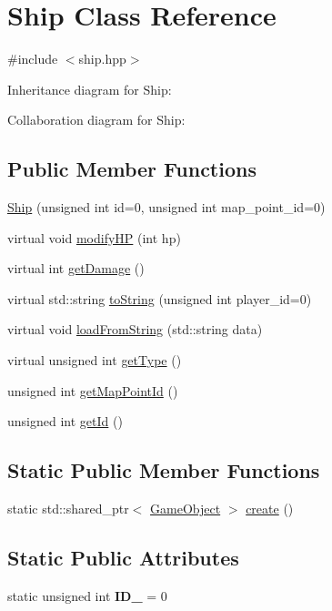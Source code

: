 \hypertarget{classShip}{}\section{Ship Class Reference}
\label{classShip}


{\ttfamily \#include $<$ship.\+hpp$>$}



Inheritance diagram for Ship\+:


Collaboration diagram for Ship\+:
\subsection*{Public Member Functions}
\begin{DoxyCompactItemize}
\item 
\hyperlink{classShip_a53a29a2b25670010054f1213418fa0c3}{Ship} (unsigned int id=0, unsigned int map\+\_\+point\+\_\+id=0)
\item 
virtual void \hyperlink{classShip_af692fb5ca42305b33e0610b9ddfa86ae}{modify\+HP} (int hp)
\item 
virtual int \hyperlink{classShip_a3dc79be9726b79f233dd39e12e42cd9c}{get\+Damage} ()
\item 
virtual std\+::string \hyperlink{classShip_ad743a4cd0710f1cae47440d8c5ef1df2}{to\+String} (unsigned int player\+\_\+id=0)
\item 
virtual void \hyperlink{classShip_a5bc993a110736454a5da0afbce0adcf8}{load\+From\+String} (std\+::string data)
\item 
virtual unsigned int \hyperlink{classShip_a0ab4d1841a06e86cf75143bdd82273c0}{get\+Type} ()
\item 
unsigned int \hyperlink{classShip_afc0dda3e395f0f900d76bebc205beda0}{get\+Map\+Point\+Id} ()
\item 
unsigned int \hyperlink{classShip_a069f10228cdfb90c8e2fca03d69ffe07}{get\+Id} ()
\end{DoxyCompactItemize}
\subsection*{Static Public Member Functions}
\begin{DoxyCompactItemize}
\item 
static std\+::shared\+\_\+ptr$<$ \hyperlink{classGameObject}{Game\+Object} $>$ \hyperlink{classShip_a5c60f1ebbd3fc8203d0b3801a7214e77}{create} ()
\end{DoxyCompactItemize}
\subsection*{Static Public Attributes}
\begin{DoxyCompactItemize}
\item 
static unsigned int {\bfseries I\+D\+\_\+} = 0\hypertarget{classShip_adb8ca4703c8e46561ce2ee918e95a353}{}\label{classShip_adb8ca4703c8e46561ce2ee918e95a353}

\end{DoxyCompactItemize}
